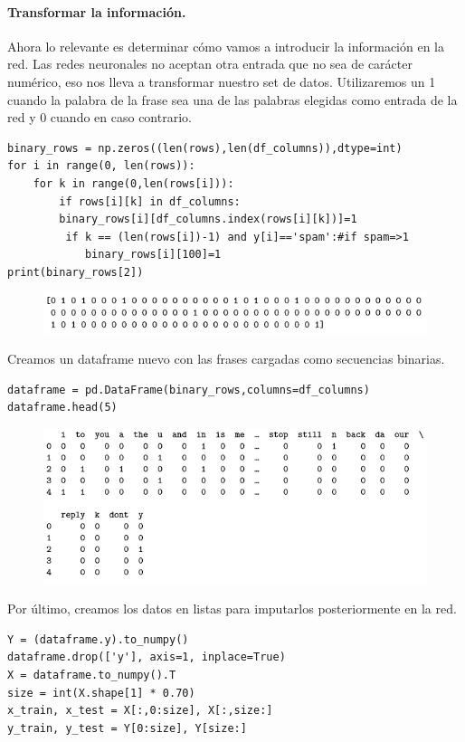 \documentclass[a4paper,11pt]{article}
\begin{document}
\paragraph{Transformar la información.}
Ahora lo relevante es determinar cómo vamos a introducir la información en la red. Las redes neuronales no aceptan otra entrada que no sea de carácter numérico, eso nos lleva a transformar nuestro set de datos. Utilizaremos un 1 cuando la palabra de la frase sea una de las palabras elegidas como entrada de la red y 0 cuando en caso contrario.
\begin{lstlisting}
binary_rows = np.zeros((len(rows),len(df_columns)),dtype=int) 
for i in range(0, len(rows)): 
    for k in range(0,len(rows[i])):
        if rows[i][k] in df_columns: 
	    binary_rows[i][df_columns.index(rows[i][k])]=1
         if k == (len(rows[i])-1) and y[i]=='spam':#if spam=>1 
            binary_rows[i][100]=1
print(binary_rows[2])
\end{lstlisting}
\begin{figure}[H]
\centering
\includegraphics[scale=0.83]{Annotation 2020-03-23 182035.png}
\end{figure}
Creamos un dataframe nuevo con las frases cargadas como secuencias binarias.
\begin{lstlisting}
dataframe = pd.DataFrame(binary_rows,columns=df_columns) 
dataframe.head(5)
\end{lstlisting}
\begin{figure}[H]
\centering
\includegraphics[scale=0.83]{Annotation 2020-03-23 182154.png}
\end{figure}
Por último, creamos los datos en listas para imputarlos posteriormente en la red.
\begin{lstlisting}
Y = (dataframe.y).to_numpy() 
dataframe.drop(['y'], axis=1, inplace=True)
X = dataframe.to_numpy().T 
size = int(X.shape[1] * 0.70) 
x_train, x_test = X[:,0:size], X[:,size:] 
y_train, y_test = Y[0:size], Y[size:]
\end{lstlisting}
\end{document}
